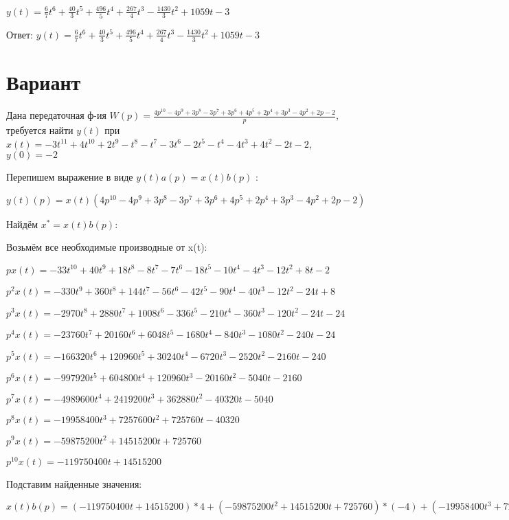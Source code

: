 \documentclass{article}
\begin{document}
{{{{{{$y(t)=\frac{6}{7}t^{6}+\frac{40}{3}t^{5}+\frac{496}{5}t^{4}+\frac{267}{4}t^{3}-\frac{1430}{3}t^{2}+1059t-3$

Ответ: $y(t) = \frac{6}{7}t^{6}+\frac{40}{3}t^{5}+\frac{496}{5}t^{4}+\frac{267}{4}t^{3}-\frac{1430}{3}t^{2}+1059t-3$

\section{Вариант}

Дана передаточная ф-ия $W(p)=\frac{4p^{10}-4p^{9}+3p^{8}-3p^{7}+3p^{6}+4p^{5}+2p^{4}+3p^{3}-4p^{2}+2p-2}{p}$, требуется найти $y(t)$ при $x(t)=-3t^{11}+4t^{10}+2t^{9}-t^{8}-t^{7}-3t^{6}-2t^{5}-t^{4}-4t^{3}+4t^{2}-2t-2$, $y(0)=-2$

Перепишем выражение в виде $y(t)a(p)=x(t)b(p)$ :

$y(t)(p)=x(t)(4p^{10}-4p^{9}+3p^{8}-3p^{7}+3p^{6}+4p^{5}+2p^{4}+3p^{3}-4p^{2}+2p-2)$

Найдём $x^*=x(t)b(p)$:

Возьмём все необходимые производные от x(t):

$px(t)=-33t^{10}+40t^{9}+18t^{8}-8t^{7}-7t^{6}-18t^{5}-10t^{4}-4t^{3}-12t^{2}+8t-2$

$p^2x(t)=-330t^{9}+360t^{8}+144t^{7}-56t^{6}-42t^{5}-90t^{4}-40t^{3}-12t^{2}-24t+8$

$p^3x(t)=-2970t^{8}+2880t^{7}+1008t^{6}-336t^{5}-210t^{4}-360t^{3}-120t^{2}-24t-24$

$p^4x(t)=-23760t^{7}+20160t^{6}+6048t^{5}-1680t^{4}-840t^{3}-1080t^{2}-240t-24$

$p^5x(t)=-166320t^{6}+120960t^{5}+30240t^{4}-6720t^{3}-2520t^{2}-2160t-240$

$p^6x(t)=-997920t^{5}+604800t^{4}+120960t^{3}-20160t^{2}-5040t-2160$

$p^7x(t)=-4989600t^{4}+2419200t^{3}+362880t^{2}-40320t-5040$

$p^8x(t)=-19958400t^{3}+7257600t^{2}+725760t-40320$

$p^9x(t)=-59875200t^{2}+14515200t+725760$

$p^10x(t)=-119750400t+14515200$

Подставим найденные значения:

$x(t)b(p) = (-119750400t+14515200)*4+(-59875200t^{2}+14515200t+725760)*(-4)+(-19958400t^{3}+7257600t^{2}+725760t-40320)*3+(-4989600t^{4}+2419200t^{3}+362880t^{2}-40320t-5040)*(-3)+(-997920t^{5}+604800t^{4}+120960t^{3}-20160t^{2}-5040t-2160)*3+(-166320t^{6}+120960t^{5}+30240t^{4}-6720t^{3}-2520t^{2}-2160t-240)*4+(-23760t^{7}+20160t^{6}+6048t^{5}-1680t^{4}-840t^{3}-1080t^{2}-240t-24)*2+(-2970t^{8}+2880t^{7}+1008t^{6}-336t^{5}-210t^{4}-360t^{3}-120t^{2}-24t-24)*3+(-330t^{9}+360t^{8}+144t^{7}-56t^{6}-42t^{5}-90t^{4}-40t^{3}-12t^{2}-24t+8)*(-4)+(-33t^{10}+40t^{9}+18t^{8}-8t^{7}-7t^{6}-18t^{5}-10t^{4}-4t^{3}-12t^{2}+8t-2)*2+(-33t^{10}+40t^{9}+18t^{8}-8t^{7}-7t^{6}-18t^{5}-10t^{4}-4t^{3}-12t^{2}+8t-2)*(-2)=1320t^{9}-10350t^{8}-39456t^{7}-621712t^{6}-2498664t^{5}+16900530t^{4}-66799400t^{3}+260111928t^{2}-534788376t$





}}}}}}
\end{document}
